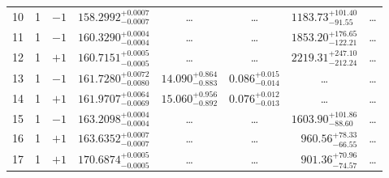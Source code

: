 \begin{table*}[!]
\begin{tabular}{llcrrlrc}
10 & 1 & $-1$ & $    158.2992_{-      0.0007}^{+      0.0007}$ & \multicolumn{1}{c}{\dots} & \multicolumn{1}{c}{\dots} & $     1183.73_{-       91.55}^{+      101.40}$ & \dots \\[1pt]
11 & 1 & $-1$ & $    160.3290_{-      0.0004}^{+      0.0004}$ & \multicolumn{1}{c}{\dots} & \multicolumn{1}{c}{\dots} & $     1853.20_{-      122.21}^{+      176.65}$ & \dots \\[1pt]
12 & 1 & $+1$ & $    160.7151_{-      0.0005}^{+      0.0005}$ & \multicolumn{1}{c}{\dots} & \multicolumn{1}{c}{\dots} & $     2219.31_{-      212.24}^{+      247.10}$ & \dots \\[1pt]
13 & 1 & $-1$ & $    161.7280_{-      0.0080}^{+      0.0072}$ & $      14.090_{-       0.883}^{+       0.864}$ & $       0.086_{-       0.014}^{+       0.015}$ & \multicolumn{1}{c}{\dots} & \dots \\[1pt]
14 & 1 & $+1$ & $    161.9707_{-      0.0069}^{+      0.0064}$ & $      15.060_{-       0.892}^{+       0.956}$ & $       0.076_{-       0.013}^{+       0.012}$ & \multicolumn{1}{c}{\dots} & \dots \\[1pt]
15 & 1 & $-1$ & $    163.2098_{-      0.0004}^{+      0.0004}$ & \multicolumn{1}{c}{\dots} & \multicolumn{1}{c}{\dots} & $     1603.90_{-       88.60}^{+      101.86}$ & \dots \\[1pt]
16 & 1 & $+1$ & $    163.6352_{-      0.0007}^{+      0.0007}$ & \multicolumn{1}{c}{\dots} & \multicolumn{1}{c}{\dots} & $      960.56_{-       66.55}^{+       78.33}$ & \dots \\[1pt]
17 & 1 & $+1$ & $    170.6874_{-      0.0005}^{+      0.0005}$ & \multicolumn{1}{c}{\dots} & \multicolumn{1}{c}{\dots} & $      901.36_{-       74.57}^{+       70.96}$ & \dots \\[1pt]


\end{tabular}
\end{table*}

